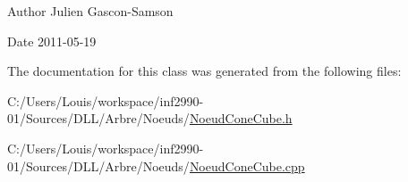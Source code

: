 \begin{DoxyAuthor}{Author}
Julien Gascon-\/\+Samson 
\end{DoxyAuthor}
\begin{DoxyDate}{Date}
2011-\/05-\/19 
\end{DoxyDate}


The documentation for this class was generated from the following files\+:\begin{DoxyCompactItemize}
\item 
C\+:/\+Users/\+Louis/workspace/inf2990-\/01/\+Sources/\+D\+L\+L/\+Arbre/\+Noeuds/\hyperlink{_noeud_cone_cube_8h}{Noeud\+Cone\+Cube.\+h}\item 
C\+:/\+Users/\+Louis/workspace/inf2990-\/01/\+Sources/\+D\+L\+L/\+Arbre/\+Noeuds/\hyperlink{_noeud_cone_cube_8cpp}{Noeud\+Cone\+Cube.\+cpp}\end{DoxyCompactItemize}
